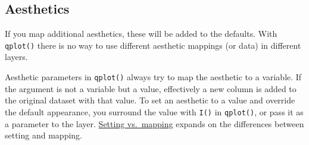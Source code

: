 \begin{Shaded}
\begin{Highlighting}[]
 
\StringTok{ }\NormalTok{()}
\end{Highlighting}
\end{Shaded}

\subsection{Aesthetics}

If you map additional aesthetics, these will be added to the defaults.
With \texttt{qplot()} there is no way to use different aesthetic
mappings (or data) in different layers.

\begin{Shaded}
\begin{Highlighting}[]
   
  \StringTok{ }
\StringTok{  }\NormalTok{()}
\end{Highlighting}
\end{Shaded}

Aesthetic parameters in \texttt{qplot()} always try to map the aesthetic
to a variable. If the argument is not a variable but a value,
effectively a new column is added to the original dataset with that
value. To set an aesthetic to a value and override the default
appearance, you surround the value with \texttt{I()} in
\texttt{qplot()}, or pass it as a parameter to the layer.
\hyperref[sub:setting-mapping]{Setting vs.~mapping} expands on the
differences between setting and mapping.

\begin{Shaded}
\begin{Highlighting}[]
  \NormalTok{(}\NormalTok{))}
\StringTok{ }\NormalTok{(} \NormalTok{)}
\end{Highlighting}
\end{Shaded}

